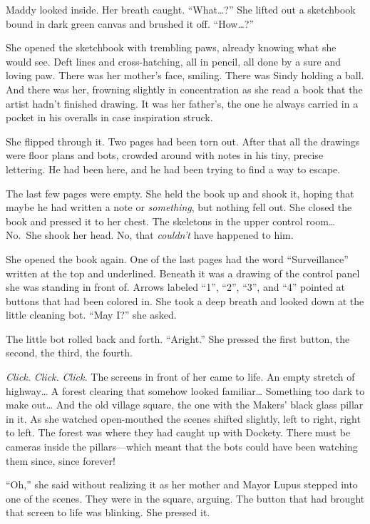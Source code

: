 \documentclass[10pt]{article}
\begin{document}
Maddy looked inside. Her breath caught. ``What\ldots{}?'' She lifted out
a sketchbook bound in dark green canvas and brushed it off.
``How\ldots{}?''

She opened the sketchbook with trembling paws, already knowing what she
would see. Deft lines and cross-hatching, all in pencil, all done by a
sure and loving paw. There was her mother's face, smiling. There was
Sindy holding a ball. And there was her, frowning slightly in
concentration as she read a book that the artist hadn't finished
drawing. It was her father's, the one he always carried in a pocket in
his overalls in case inspiration struck.

She flipped through it. Two pages had been torn out. After that all the
drawings were floor plans and bots, crowded around with notes in his
tiny, precise lettering. He had been here, and he had been trying to
find a way to escape.

The last few pages were empty. She held the book up and shook it, hoping
that maybe he had written a note or \emph{something}, but nothing fell
out. She closed the book and pressed it to her chest. The skeletons in
the upper control room\ldots{} No.~She shook her head. No, that
\emph{couldn't} have happened to him.

She opened the book again. One of the last pages had the word
``Surveillance'' written at the top and underlined. Beneath it was a
drawing of the control panel she was standing in front of. Arrows
labeled ``1'', ``2'', ``3'', and ``4'' pointed at buttons that had been
colored in. She took a deep breath and looked down at the little
cleaning bot. ``May I?'' she asked.

The little bot rolled back and forth. ``Aright.'' She pressed the first
button, the second, the third, the fourth.

\emph{Click.} \emph{Click.} \emph{Click.} The screens in front of her
came to life. An empty stretch of highway\ldots{} A forest clearing that
somehow looked familiar\ldots{} Something too dark to make out\ldots{}
And the old village square, the one with the Makers' black glass pillar
in it. As she watched open-mouthed the scenes shifted slightly, left to
right, right to left. The forest was where they had caught up with
Dockety. There must be cameras inside the pillars---which meant that the
bots could have been watching them since, since forever!

``Oh,'' she said without realizing it as her mother and Mayor Lupus
stepped into one of the scenes. They were in the square, arguing. The
button that had brought that screen to life was blinking. She pressed
it.
\end{document}
